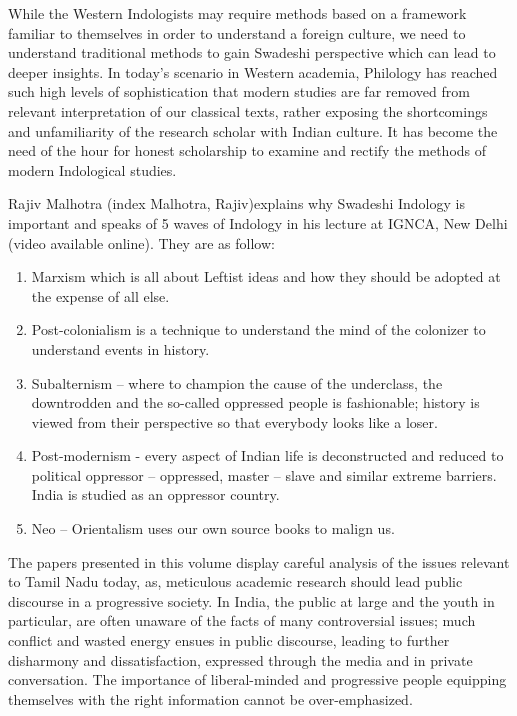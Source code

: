 While the Western Indologists may require methods based on a framework familiar to themselves in order to understand a foreign culture, we need to understand traditional methods to gain Swadeshi perspective which can lead to deeper insights. In today’s scenario in Western academia, Philology has reached such high levels of sophistication that modern studies are far removed from relevant interpretation of our classical texts, rather exposing the shortcomings and unfamiliarity of the research scholar with Indian culture. It has become the need of the hour for honest scholarship to examine and rectify the methods of modern Indological studies.

Rajiv Malhotra (index Malhotra, Rajiv)explains why Swadeshi Indology is important and speaks of 5 waves of Indology in his lecture at IGNCA, New Delhi (video available online). They are as follow:

\begin{enumerate}[{\rm 1)}]
\itemsep=0pt
\item Marxism which is all about Leftist ideas and how they should be adopted at the expense of all else.

 \item Post-colonialism is a technique to understand the mind of the colonizer to understand events in history.

 \item Subalternism – where to champion the cause of the underclass, the downtrodden and the so-called oppressed people is fashionable; history is viewed from their perspective so that everybody looks like a loser. 

 \item Post-modernism - every aspect of Indian life is deconstructed and reduced to political oppressor – oppressed, master – slave and similar extreme barriers. India is studied as an oppressor country.

 \item Neo – Orientalism uses our own source books to malign us.

\end{enumerate}

The papers presented in this volume display careful analysis of the issues relevant to Tamil Nadu today, as, meticulous academic research should lead public discourse in a progressive society. In India, the public at large and the youth in particular, are often unaware of the facts of many controversial issues; much conflict and wasted energy ensues in public discourse, leading to further disharmony and dissatisfaction, expressed through the media and in private conversation. The importance of liberal-minded and progressive people equipping themselves with the right information cannot be over-emphasized.

